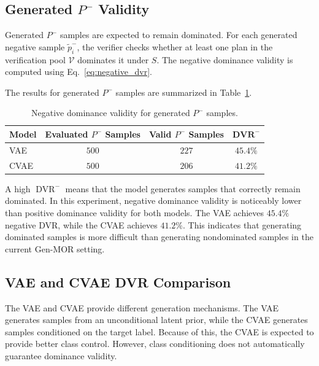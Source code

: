 \subsection{Generated $P^{-}$ Validity}
\label{subsec:generated_negative_validity}

Generated $P^{-}$ samples are expected to remain dominated. For each generated negative sample $\tilde{p}^{-}_i$, the verifier checks whether at least one plan in the verification pool $\mathcal{V}$ dominates it under $S$. The negative dominance validity is computed using Eq.~\eqref{eq:negative_dvr}.

The results for generated $P^{-}$ samples are summarized in Table~\ref{tab:negative_dvr_results}.

\begin{table}[H]
\centering
\caption{Negative dominance validity for generated $P^{-}$ samples.}
\label{tab:negative_dvr_results}
\begin{tabular}{|l|c|c|c|}
\hline
\textbf{Model} & \textbf{Evaluated $P^{-}$ Samples} & \textbf{Valid $P^{-}$ Samples} & $\mathbf{DVR^{-}}$ \\
\hline
VAE & $500$ & $227$ & $45.4\%$ \\
CVAE & $500$ & $206$ & $41.2\%$ \\
\hline
\end{tabular}
\end{table}

A high $\operatorname{DVR}^{-}$ means that the model generates samples that correctly remain dominated. In this experiment, negative dominance validity is noticeably lower than positive dominance validity for both models. The VAE achieves $45.4\%$ negative DVR, while the CVAE achieves $41.2\%$. This indicates that generating dominated samples is more difficult than generating nondominated samples in the current Gen-MOR setting.

\subsection{VAE and CVAE DVR Comparison}
\label{subsec:vae_cvae_dvr_comparison}

The VAE and CVAE provide different generation mechanisms. The VAE generates samples from an unconditional latent prior, while the CVAE generates samples conditioned on the target label. Because of this, the CVAE is expected to provide better class control. However, class conditioning does not automatically guarantee dominance validity.

